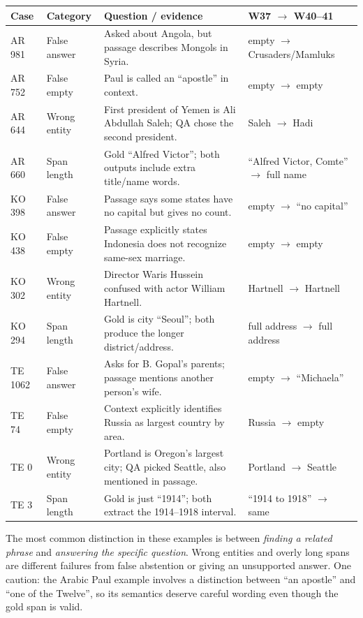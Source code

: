 \documentclass[10pt,a4paper]{article}
\begin{document}
\vspace{2pt}
\begin{tabularx}{\linewidth}{@{}l p{1.5cm} Y p{3.0cm}@{}}
\toprule
Case & Category & Question / evidence & W37 $\rightarrow$ W40--41\\
\midrule
AR 981 & False answer & Asked about Angola, but passage describes Mongols in Syria. & empty $\rightarrow$ Crusaders/Mamluks\\
AR 752 & False empty & Paul is called an ``apostle'' in context. & empty $\rightarrow$ empty\\
AR 644 & Wrong entity & First president of Yemen is Ali Abdullah Saleh; QA chose the second president. & Saleh $\rightarrow$ Hadi\\
AR 660 & Span length & Gold ``Alfred Victor''; both outputs include extra title/name words. & ``Alfred Victor, Comte'' $\rightarrow$ full name\\
\midrule
KO 398 & False answer & Passage says some states have no capital but gives no count. & empty $\rightarrow$ ``no capital''\\
KO 438 & False empty & Passage explicitly states Indonesia does not recognize same-sex marriage. & empty $\rightarrow$ empty\\
KO 302 & Wrong entity & Director Waris Hussein confused with actor William Hartnell. & Hartnell $\rightarrow$ Hartnell\\
KO 294 & Span length & Gold is city ``Seoul''; both produce the longer district/address. & full address $\rightarrow$ full address\\
\midrule
TE 1062 & False answer & Asks for B. Gopal's parents; passage mentions another person's wife. & empty $\rightarrow$ ``Michaela''\\
TE 74 & False empty & Context explicitly identifies Russia as largest country by area. & Russia $\rightarrow$ empty\\
TE 0 & Wrong entity & Portland is Oregon's largest city; QA picked Seattle, also mentioned in passage. & Portland $\rightarrow$ Seattle\\
TE 3 & Span length & Gold is just ``1914''; both extract the 1914--1918 interval. & ``1914 to 1918'' $\rightarrow$ same\\
\bottomrule
\end{tabularx}

\vspace{2pt}
The most common distinction in these examples is between \emph{finding a related phrase} and \emph{answering the specific question}. Wrong entities and overly long spans are different failures from false abstention or giving an unsupported answer. One caution: the Arabic Paul example involves a distinction between ``an apostle'' and ``one of the Twelve'', so its semantics deserve careful wording even though the gold span is valid.
\end{document}
